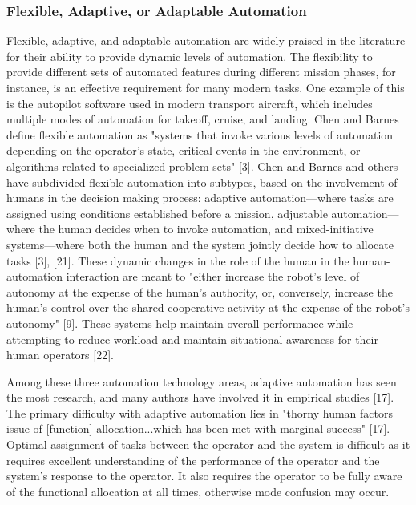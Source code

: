 \subsubsection{Flexible, Adaptive, or Adaptable Automation}
Flexible, adaptive, and adaptable automation are widely praised in the literature for their ability to provide dynamic levels of automation. The flexibility to provide different sets of automated features during different mission phases, for instance, is an effective requirement for many modern tasks. One example of this is the autopilot software used in modern transport aircraft, which includes multiple modes of automation for takeoff, cruise, and landing. Chen and Barnes define flexible automation as "systems that invoke various levels of automation depending on the operator’s state, critical events in the environment, or algorithms related to specialized problem sets" [3]. Chen and Barnes and others have subdivided flexible automation into subtypes, based on the involvement of humans in the decision making process: adaptive automation—where tasks are assigned using conditions established before a mission, adjustable automation—where the human decides when to invoke automation, and mixed-initiative systems—where both the human and the system jointly decide how to allocate tasks [3], [21]. These dynamic changes in the role of the human in the human-automation interaction are meant to "either increase the robot’s level of autonomy at the expense of the human’s authority, or, conversely, increase the human’s control over the shared cooperative activity at the expense of the robot’s autonomy" [9]. These systems help maintain overall performance while attempting to reduce workload and maintain situational awareness for their human operators [22].

Among these three automation technology areas, adaptive automation has seen the most research, and many authors have involved it in empirical studies [17]. The primary difficulty with adaptive automation lies in "thorny human factors issue of [function] allocation...which has been met with marginal success" [17]. Optimal assignment of tasks between the operator and the system is difficult as it requires excellent understanding of the performance of the operator and the system's response to the operator. It also requires the operator to be fully aware of the functional allocation at all times, otherwise mode confusion may occur.

